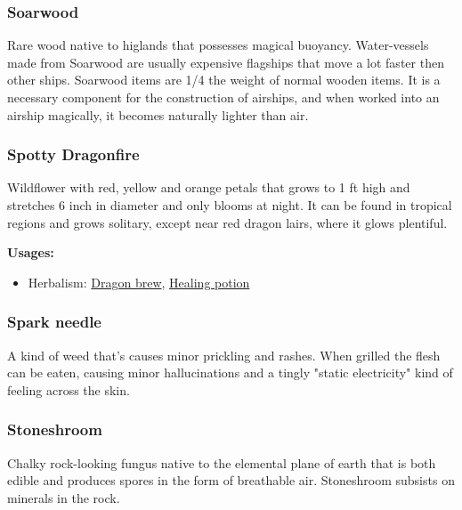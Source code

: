 \subsubsection{Soarwood}

Rare wood native to higlands that possesses magical buoyancy. Water-vessels made from Soarwood are usually expensive flagships that move a lot faster then other ships. Soarwood items are 1/4 the weight of normal wooden items. It is a necessary component for the construction of airships, and when worked into an airship magically, it becomes naturally lighter than air.

\subsubsection{Spotty Dragonfire}
\label{Spotty Dragonfire}

Wildflower with red, yellow and orange petals that grows to 1 ft high and stretches 6 inch in diameter and only blooms at night. It can be found in tropical regions and grows solitary, except near red dragon lairs, where it glows plentiful.

\vspace{5mm}

\textbf{Usages:}

\begin{itemize}[noitemsep]
\item[] Herbalism: \hyperref[Dragon brew]{Dragon brew}, \hyperref[healing_potion]{Healing potion}
\end{itemize}

\subsubsection{Spark needle}
\label{spark_needle}

A kind of weed that's causes minor prickling and rashes. When grilled the flesh can be eaten, causing minor hallucinations and a tingly "static electricity" kind of feeling across the skin.

\subsubsection{Stoneshroom}
\label{Stoneshroom}

Chalky rock-looking fungus native to the elemental plane of earth that is both edible and produces spores in the form of breathable air. Stoneshroom subsists on minerals in the rock.

\vspace{5mm}

